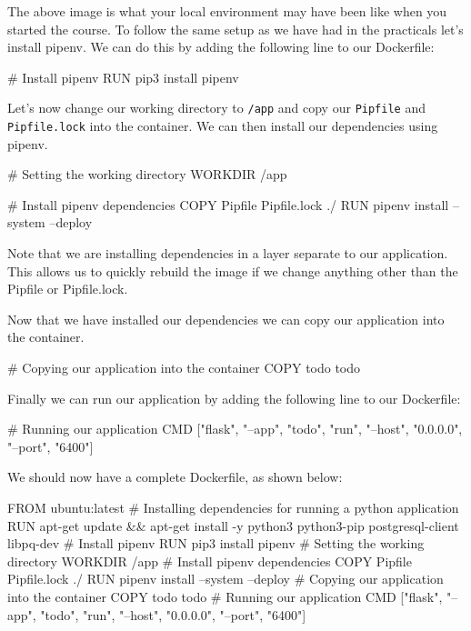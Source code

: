 \documentclass{csse4400}
\begin{document}
The above image is what your local environment may have been like when you started the course.
To follow the same setup as we have had in the practicals let's install pipenv.
We can do this by adding the following line to our Dockerfile:

\begin{code}[language=docker,numbers=none]{}
# Install pipenv
RUN pip3 install pipenv
\end{code}

Let's now change our working directory to \texttt{/app} and copy our \texttt{Pipfile} and \texttt{Pipfile.lock} into the container.
We can then install our dependencies using pipenv.

\begin{code}[language=docker,numbers=none]{}
# Setting the working directory
WORKDIR /app

# Install pipenv dependencies
COPY Pipfile Pipfile.lock ./
RUN pipenv install --system --deploy
\end{code}

Note that we are installing dependencies in a layer separate to our application.
This allows us to quickly rebuild the image if we change anything other than the Pipfile or Pipfile.lock.

Now that we have installed our dependencies we can copy our application into the container.

\begin{code}[language=docker,numbers=none]{}
# Copying our application into the container
COPY todo todo
\end{code}

Finally we can run our application by adding the following line to our Dockerfile:

\begin{code}[language=docker,numbers=none]{}
# Running our application
CMD ["flask", "--app", "todo", "run", "--host", "0.0.0.0", "--port", "6400"]
\end{code}

We should now have a complete Dockerfile, as shown below:

\begin{code}[language=docker,numbers=none]{}
  FROM ubuntu:latest
  # Installing dependencies for running a python application
  RUN apt-get update && apt-get install -y python3 python3-pip postgresql-client libpq-dev
  # Install pipenv
  RUN pip3 install pipenv
  # Setting the working directory
  WORKDIR /app
  # Install pipenv dependencies
  COPY Pipfile Pipfile.lock ./
  RUN pipenv install --system --deploy
  # Copying our application into the container
  COPY todo todo
  # Running our application
  CMD ["flask", "--app", "todo", "run", "--host", "0.0.0.0", "--port", "6400"]
\end{code}
\end{document}
